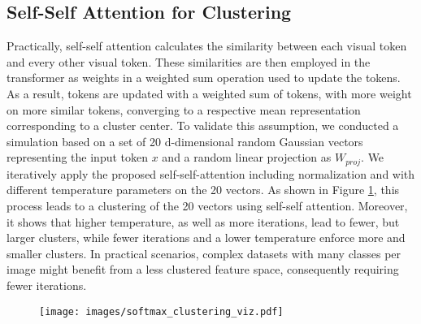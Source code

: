 \documentclass[10pt,twocolumn,letterpaper]{article}
\begin{document}
\subsection{Self-Self Attention for Clustering}\label{subsec:ssa_clustering}
Practically, self-self attention calculates the similarity between each visual token and every other visual token. These similarities are then employed in the transformer as weights in a weighted sum operation used to update the tokens.
As a result, tokens are updated with a weighted sum of tokens, with more weight on more similar tokens, converging to a respective mean representation corresponding to a cluster center.
To validate this assumption, we conducted a simulation based on a set of 20 d-dimensional random Gaussian vectors representing the input token $x$ and a random linear projection as $W_{proj}$. We iteratively apply the proposed self-self-attention including normalization and with different temperature parameters on the 20 vectors.
As shown in Figure \ref{fig:softmax-clustering}, this process leads to a clustering of the 20 vectors using self-self attention. Moreover, it shows that higher temperature, as well as more iterations, lead to fewer, but larger clusters, while fewer iterations and a lower temperature enforce more and smaller clusters. In practical scenarios, complex datasets with many classes per image might benefit from a less clustered feature space, consequently requiring fewer iterations.

\begin{figure}
\centering
\texttt{[image: images/softmax\_clustering\_viz.pdf]}
\label{fig:softmax-clustering}\vspace{-5mm}
\end{figure}
\end{document}
